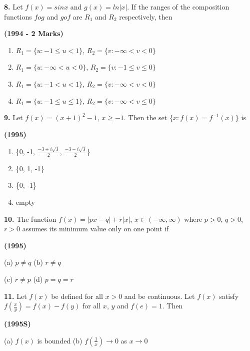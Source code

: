 \documentclass[journal,12pt,twocolumn]{IEEEtran}
\theoremstyle{remark}
\begin{document}
\textbf{8.} Let $f(x)=sinx$ and $g(x)=ln|x|$. If the ranges of the composition functions $fog$ and $gof$ are $R_1$ and $R_2$ respectively, then 

\hfill{\textbf{(1994 - 2 Marks)}}

\begin{enumerate}
\item[(a)] $R_1=\{u:-1\le u<1\}$, $R_2=\{v:-\infty<v<0\}$
\item[(b)] $R_1=\{u:-\infty<u<0\}$, $R_2=\{v:-1\le v\le0\}$
\item[(c)] $R_1=\{u:-1<u<1\}$, $R_2=\{v:-\infty<v<0\}$
\item[(d)] $R_1=\{u:-1\le u\le1\}$, $R_2=\{v:-\infty<v\le0\}$
\end{enumerate}

\textbf{9.} Let $f(x)=(x+1)^{2}-1$, $x\ge-1$. Then the set $\{x:f(x)=f^{-1}(x)\}$ is

\hfill{\textbf{(1995)}}

\begin{enumerate}
\item[(a)] \{0, -1, $\frac{-3+i\sqrt{3}}{2}$, $\frac{-3-i\sqrt{3}}{2}$\}
\item[(b)] \{0, 1, -1\}
\item[(c)] \{0, -1\}
\item[(d)] empty
\end{enumerate}

\textbf{10.} The function $f(x)=|px-q|+r|x|$, $x\in(-\infty,\infty)$ where $p>0$, $q>0$, $r>0$ assumes its minimum value only on one point if

\hfill{\textbf{(1995)}}

\begin{tabbing}
	(a) $p\neq q$ \hspace{.8em} (b) $r\neq q$
\end{tabbing}

\begin{tabbing} 
	(c) $r\neq p$ \hspace{.8em} (d) $p=q=r$
\end{tabbing}

\textbf{11.} Let $f(x)$ be defined for all $x>0$ and be continuous. Let $f(x)$ satisfy $f\left(\frac{x}{y}\right)=f(x)-f(y)$ for all $x$, $y$ and $f(e)=1$. Then

\hfill{\textbf{(1995S)}}

\begin{tabbing}
	(a) $f(x)$ is bounded \hspace{.8em} (b) $f\left(\frac{1}{x}\right)\to0$ as $x\to0$
\end{tabbing}
\end{document}
